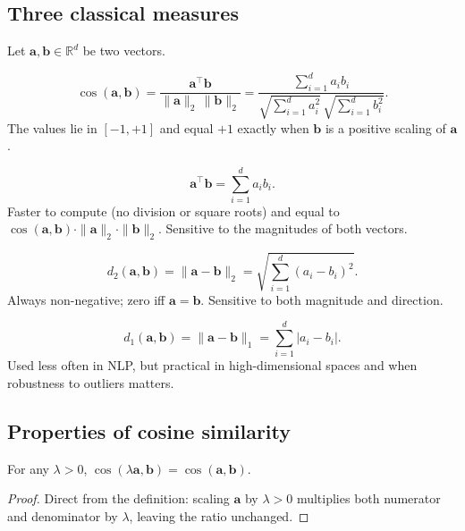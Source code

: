 \subsection{Three classical measures}

Let $\mathbf{a}, \mathbf{b} \in \mathbb{R}^d$ be two vectors.

\begin{definition}
\[ \cos(\mathbf{a}, \mathbf{b}) = \frac{\mathbf{a}^\top \mathbf{b}}{\|\mathbf{a}\|_2\, \|\mathbf{b}\|_2} = \frac{\sum_{i=1}^{d} a_i b_i}{\sqrt{\sum_{i=1}^{d} a_i^2}\, \sqrt{\sum_{i=1}^{d} b_i^2}}. \]
The values lie in $[-1, +1]$ and equal $+1$ exactly when $\mathbf{b}$ is a positive scaling of $\mathbf{a}$.
\end{definition}

\begin{definition}
\[ \mathbf{a}^\top \mathbf{b} = \sum_{i=1}^{d} a_i b_i. \]
Faster to compute (no division or square roots) and equal to $\cos(\mathbf{a}, \mathbf{b}) \cdot \|\mathbf{a}\|_2 \cdot \|\mathbf{b}\|_2$. Sensitive to the magnitudes of both vectors.
\end{definition}

\begin{definition}
\[ d_2(\mathbf{a}, \mathbf{b}) = \|\mathbf{a} - \mathbf{b}\|_2 = \sqrt{\sum_{i=1}^{d} (a_i - b_i)^2}. \]
Always non-negative; zero iff $\mathbf{a} = \mathbf{b}$. Sensitive to both magnitude and direction.
\end{definition}

\begin{definition}
\[ d_1(\mathbf{a}, \mathbf{b}) = \|\mathbf{a} - \mathbf{b}\|_1 = \sum_{i=1}^{d} |a_i - b_i|. \]
Used less often in NLP, but practical in high-dimensional spaces and when robustness to outliers matters.
\end{definition}

\subsection{Properties of cosine similarity}

\begin{property}
For any $\lambda > 0$, $\cos(\lambda \mathbf{a}, \mathbf{b}) = \cos(\mathbf{a}, \mathbf{b})$.
\end{property}

\begin{proof}
Direct from the definition: scaling $\mathbf{a}$ by $\lambda > 0$ multiplies both numerator and denominator by $\lambda$, leaving the ratio unchanged.
\end{proof}

